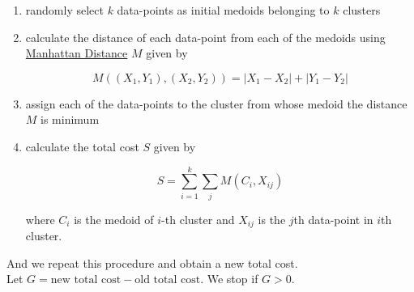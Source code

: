 \documentclass[11pt, a4paper]{article}
\begin{document}
\begin{enumerate}[(1)]
\item randomly select $k$ data-points as initial medoids belonging to $k$ clusters
\item calculate the distance of each data-point from each of the medoids using \underline{Manhattan Distance} $M$ given by

$$M((X_1, Y_1), (X_2, Y_2)) = |X_1 - X_2|+|Y_1 - Y_2|$$

\item assign each of the data-points to the cluster from whose medoid the distance $M$ is minimum
\item calculate the total cost $S$ given by

$$S = \sum\limits_{i = 1}^{k} \sum\limits_{j} M(C_i, X_{ij})$$

where $C_i$ is the medoid of $i$-th cluster and $X_{ij}$ is the $j$th data-point in $i$th cluster.

\end{enumerate}

And we repeat this procedure and obtain a new total cost. \\

Let $G = \text{new total cost} - \text{old total cost}$. We stop if $G > 0$.
\end{document}
